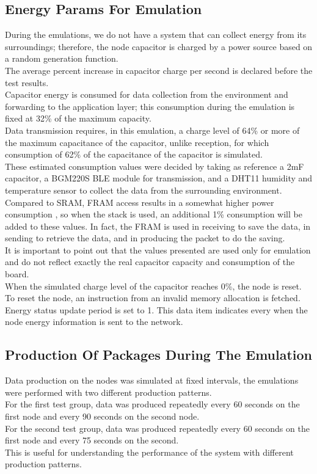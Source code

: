 \subsection{Energy Params For Emulation}
During the emulations, we do not have a system that can collect energy from its surroundings; therefore, the node capacitor is charged by a power source based on a random generation function.\\
The average percent increase in capacitor charge per second is declared before the test results.\\
Capacitor energy is consumed for data collection from the environment and forwarding to the application layer; this consumption during the emulation is fixed at 32\% of the maximum capacity.\\
Data transmission requires, in this emulation, a charge level of 64\% or more of the maximum capacitance of the capacitor, unlike reception, for which consumption of 62\% of the capacitance of the capacitor is simulated.\\
These estimated consumption values were decided by taking as reference a 2mF capacitor, a BGM220S BLE module \cite{BLEModule} for transmission, and a DHT11 humidity and temperature sensor \cite{DHT11Module} to collect the data from the surrounding environment.\\
Compared to SRAM, FRAM access results in a somewhat higher power consumption \cite{MSP430FRAMDS}, so when the stack is used, an additional 1\% consumption will be added to these values. In fact, the FRAM is used in receiving to save the data, in sending to retrieve the data, and in producing the packet to do the saving.\\
It is important to point out that the values presented are used only for emulation and do not reflect exactly the real capacitor capacity and consumption of the board.\\
When the simulated charge level of the capacitor reaches 0\%, the node is reset. To reset the node, an instruction from an invalid memory allocation is fetched.\\
Energy status update period is set to 1. This data item indicates every when the node energy information is sent to the network.
\subsection{Production Of Packages During The Emulation}
Data production on the nodes was simulated at fixed intervals, the emulations were performed with two different production patterns.\\
For the first test group, data was produced repeatedly every 60 seconds on the first node and every 90 seconds on the second node.\\
For the second test group, data was produced repeatedly every 60 seconds on the first node and every 75 seconds on the second.\\
This is useful for understanding the performance of the system with different production patterns.
